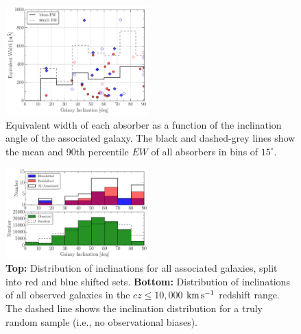 \documentclass[twocolumn,tighten]{aastex6}
\providecommand{\DIFaddbeginFL}{} %
\providecommand{\DIFaddendFL}{} %
\providecommand{\DIFdelbeginFL}{} %
\providecommand{\DIFdelendFL}{} %
\begin{document}
\begin{figure}[h!]
        \centering
        \includegraphics[width=0.49\textwidth]{fig8.pdf}
        \caption{\DIFdelbeginFL %
\DIFdelendFL \DIFaddbeginFL \small{Equivalent width of each absorber as a function of the inclination angle of the associated galaxy. The black and dashed-grey lines show the mean and 90th percentile $EW$ of all absorbers in bins of $15^{\circ}$.}\DIFaddendFL }
        \label{ew_vs_inclination}
        \vspace{2pt}
\end{figure}

\begin{figure}[h!]
        \centering
        \includegraphics[width=0.49\textwidth]{fig9.pdf}
        \caption{\small{\textbf{Top: }Distribution of inclinations for all associated galaxies, split into red and blue shifted sets. \textbf{Bottom:} Distribution of inclinations of all observed galaxies in the $cz \leq 10,000$ $\rm km\, s^{-1}$ redshift range. The dashed line shows the inclination distribution for a truly random sample (i.e., no observational biases).}}
        \label{hist_inc}
        \vspace{2pt}
\end{figure}
\end{document}
